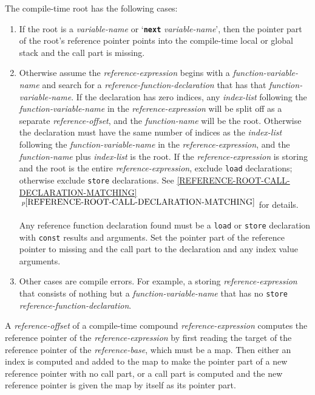 \documentclass[12pt]{article}
\newcommand{\TT}[1]{{\tt \bfseries #1}}
\newcommand{\itemref}[1]{\ref{#1}$\,^{p\pageref{#1}}$}
\begin{document}
The compile-time root has the following cases:
\begin{enumerate}
\item If the root is a {\em variable-name} or
`\TT{next} {\em variable-name}', then the pointer part of the root's
reference pointer points into the compile-time local or global stack
and the call part is missing.
\item\label{COMPILE-TIME-REFERENCE-ROOT-CASE}
Otherwise assume the {\em reference-expression} begins with a
{\em function-variable-name} and search
for a {\em reference-function-declaration} that has that
{\em function-variable-name}.
If the declaration has zero indices, any
{\em index-list} following the {\em function-variable-name}
in the {\em reference-expression}
will be split off as a separate {\em reference-offset}, and the
{\em function-name} will be the root.
Otherwise the declaration must have the same number of indices as
the {\em index-list} following the {\em function-variable-name}
in the {\em reference-expression}, and the {\em function-name}
plus {\em index-list} is the root.
If the {\em reference-expression} is storing and the root is the
entire {\em reference-expression}, exclude
{\tt load} declarations; otherwise exclude {\tt store} declarations.
See \itemref{REFERENCE-ROOT-CALL-DECLARATION-MATCHING} for details.

Any reference function declaration found must be a {\tt load} or {\tt store}
declaration with {\tt const} results and arguments.
Set the pointer part of the reference pointer to missing and the call part
to the declaration and any index value arguments.
\item Other cases are compile errors.
For example, a storing {\em reference-expression} that consists of nothing
but a {\em function-variable-name} that has no {\tt store}
{\em reference-function-declaration}.
\end{enumerate}

A {\em reference-offset} of a compile-time compound {\em reference-expression}
computes the reference pointer of the {\em reference-expression}
by first reading the target of the reference pointer of the
{\em reference-base}, which must be a map.  Then either an index is
computed and added to the map to make the pointer part
of a new reference pointer with no call part, or a call part is computed
and the new reference pointer is given the map by itself as its pointer part.
\end{document}
